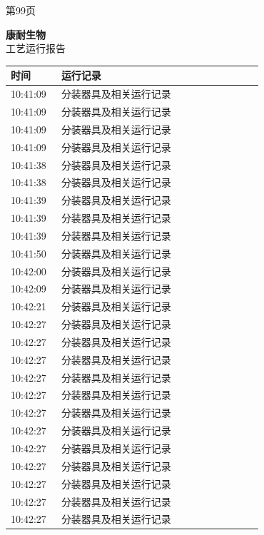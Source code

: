 \documentclass[UTF8,10pt,a4paper,fontset=fandol]{ctexart}
\begin{document}
\begin{center}
\begin{minipage}[t]{0.46\linewidth}
\vspace{3pt}
第99页
\end{minipage}
\hfill
\begin{minipage}[t]{0.46\linewidth}
\centering
\textbf{康耐生物}\\[2pt]
工艺运行报告

\vspace{4pt}
\begin{tabular}{|p{0.18\linewidth}|p{0.72\linewidth}|}
\hline
时间 & 运行记录 \\ \hline
10:41:09 & 分装器具及相关运行记录 \\ \hline
10:41:09 & 分装器具及相关运行记录 \\ \hline
10:41:09 & 分装器具及相关运行记录 \\ \hline
10:41:09 & 分装器具及相关运行记录 \\ \hline
10:41:38 & 分装器具及相关运行记录 \\ \hline
10:41:38 & 分装器具及相关运行记录 \\ \hline
10:41:39 & 分装器具及相关运行记录 \\ \hline
10:41:39 & 分装器具及相关运行记录 \\ \hline
10:41:39 & 分装器具及相关运行记录 \\ \hline
10:41:50 & 分装器具及相关运行记录 \\ \hline
10:42:00 & 分装器具及相关运行记录 \\ \hline
10:42:09 & 分装器具及相关运行记录 \\ \hline
10:42:21 & 分装器具及相关运行记录 \\ \hline
10:42:27 & 分装器具及相关运行记录 \\ \hline
10:42:27 & 分装器具及相关运行记录 \\ \hline
10:42:27 & 分装器具及相关运行记录 \\ \hline
10:42:27 & 分装器具及相关运行记录 \\ \hline
10:42:27 & 分装器具及相关运行记录 \\ \hline
10:42:27 & 分装器具及相关运行记录 \\ \hline
10:42:27 & 分装器具及相关运行记录 \\ \hline
10:42:27 & 分装器具及相关运行记录 \\ \hline
10:42:27 & 分装器具及相关运行记录 \\ \hline
10:42:27 & 分装器具及相关运行记录 \\ \hline
10:42:27 & 分装器具及相关运行记录 \\ \hline
10:42:27 & 分装器具及相关运行记录 \\ \hline

\end{tabular}
\end{minipage}
\end{center}
\end{document}

